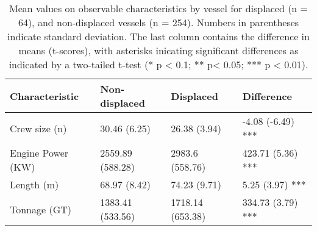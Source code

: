 \begin{table}[t]

\caption{\label{tab:}Mean values on observable characteristics by vessel for displaced (n = 64), and non-displaced vessels (n = 254). Numbers in parentheses indicate standard deviation. The last column contains the difference in means (t-scores), with asterisks inicating significant differences as indicated by a two-tailed t-test (* p < 0.1; ** p< 0.05; *** p < 0.01).}
\centering
\begin{tabular}{l|l|l|l}
\hline
Characteristic & Non-displaced & Displaced & Difference\\
\hline
Crew size (n) & 30.46 (6.25) & 26.38 (3.94) & -4.08 (-6.49) ***\\
\hline
Engine Power (KW) & 2559.89 (588.28) & 2983.6 (558.76) & 423.71 (5.36) ***\\
\hline
Length (m) & 68.97 (8.42) & 74.23 (9.71) & 5.25 (3.97) ***\\
\hline
Tonnage (GT) & 1383.41 (533.56) & 1718.14 (653.38) & 334.73 (3.79) ***\\
\hline
\end{tabular}
\end{table}